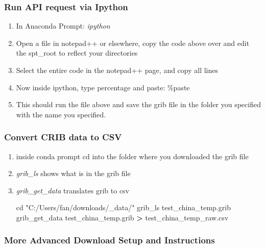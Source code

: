 \documentclass[
]{book}
\newenvironment{Shaded}{\begin{snugshade}}{\end{snugshade}}
\newcommand{\BuiltInTok}[1]{#1}
\newcommand{\ExtensionTok}[1]{#1}
\newcommand{\NormalTok}[1]{#1}
\newcommand{\OperatorTok}[1]{\textcolor[rgb]{0.81,0.36,0.00}{\textbf{#1}}}
\newcommand{\StringTok}[1]{\textcolor[rgb]{0.31,0.60,0.02}{#1}}
\providecommand{\tightlist}{%
  \setlength{\itemsep}{0pt}\setlength{\parskip}{0pt}}
\begin{document}
\hypertarget{run-api-request-via-ipython}{%
\subsubsection{Run API request via Ipython}\label{run-api-request-via-ipython}}

\begin{enumerate}
\def\labelenumi{\arabic{enumi}.}
\tightlist
\item
  In Anaconda Prompt: \emph{ipython}
\item
  Open a file in notepad++ or elsewhere, copy the code above over and edit the spt\_root to reflect your directories
\item
  Select the entire code in the notepad++ page, and copy all lines
\item
  Now inside ipython, type percentage and paste: \%paste
\item
  This should run the file above and save the grib file in the folder you specified with the name you specified.
\end{enumerate}

\hypertarget{convert-crib-data-to-csv}{%
\subsubsection{Convert CRIB data to CSV}\label{convert-crib-data-to-csv}}

\begin{enumerate}
\def\labelenumi{\arabic{enumi}.}
\item
  inside conda prompt cd into the folder where you downloaded the grib file
\item
  \emph{grib\_ls} shows what is in the grib file
\item
  \emph{grib\_get\_data} translates grib to csv

\begin{Shaded}
\begin{Highlighting}[]
\BuiltInTok{cd} \StringTok{"C:/Users/fan/downloads/\_data/"}
\ExtensionTok{grib\_ls}\NormalTok{ test\_china\_temp.grib}
\ExtensionTok{grib\_get\_data}\NormalTok{ test\_china\_temp.grib }\OperatorTok{\textgreater{}}\NormalTok{ test\_china\_temp\_raw.csv}
\end{Highlighting}
\end{Shaded}
\end{enumerate}

\hypertarget{more-advanced-download-setup-and-instructions}{%
\subsubsection{More Advanced Download Setup and Instructions}\label{more-advanced-download-setup-and-instructions}}
\end{document}

